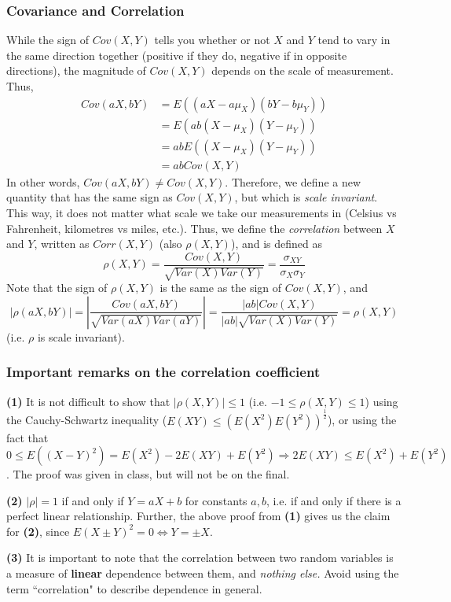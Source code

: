 \documentclass[12pt]{article}
\begin{document}
\subsubsection{Covariance and Correlation}
While the sign of $Cov(X,Y)$ tells you whether or not $X$ and $Y$ tend to vary in the same direction together (positive if they do, negative if in opposite directions), the magnitude of $Cov(X,Y)$ depends on the scale of measurement. Thus,
\begin{align*}
    Cov(aX,bY) &= E((aX - a \mu_X)(bY - b \mu_Y)) \\
        &= E(ab(X - \mu_X)(Y- \mu_Y)) \\
        &= a b E((X-\mu_X)(Y-\mu_Y)) \\
        &= a b Cov(X,Y)
\end{align*}
In other words, $Cov(aX, bY) \neq Cov(X,Y)$. Therefore, we define a new quantity that has the same sign as $Cov(X,Y)$, but which is \emph{scale invariant}. This way, it does not matter what scale we take our measurements in (Celsius vs Fahrenheit, kilometres vs miles, etc.). Thus, we define the \emph{correlation} between $X$ and $Y$, written as $Corr(X,Y)$ (also $\rho(X,Y)$), and is defined as
\[
    \rho (X,Y) = \frac{Cov(X,Y)}{\sqrt{Var(X) Var(Y)}} = \frac{\sigma_{XY}}{\sigma_X \sigma_Y}
\]
Note that the sign of $\rho (X,Y)$ is the same as the sign of $Cov(X,Y)$, and
\[
    | \rho (aX,bY) | = \left|\frac{Cov(aX,bY)}{\sqrt{Var(aX) Var(aY)}}\right| = \frac{|ab|Cov(X,Y)}{|ab|\sqrt{Var(X) Var(Y)}} = \rho (X,Y)
\]
(i.e. $\rho$ is scale invariant).

\subsubsection{Important remarks on the correlation coefficient}
\textbf{(1)} It is not difficult to show that $|\rho(X,Y)| \leq 1$ (i.e. $-1 \leq \rho(X,Y) \leq 1$) using the Cauchy-Schwartz inequality ($E(XY) \leq (E(X^2)E(Y^2))^{\frac{1}{2}}$), or using the fact that $0 \leq E((X-Y)^2) = E(X^2) - 2E(XY) + E(Y^2) \Rightarrow 2 E(XY) \leq E(X^2)+E(Y^2)$. The proof was given in class, but will not be on the final.

\textbf{(2)} $|\rho| = 1$ if and only if $Y = aX + b$ for constants $a,b$, i.e. if and only if there is a perfect linear relationship. Further, the above proof from \textbf{(1)} gives us the claim for \textbf{(2)}, since $E(X \pm Y)^2 = 0 \Leftrightarrow Y = \pm X$.

\textbf{(3)} It is important to note that the correlation between two random variables is a measure of \textbf{linear} dependence between them, and \emph{nothing else.} Avoid using the term ``correlation" to describe dependence in general.
\end{document}
